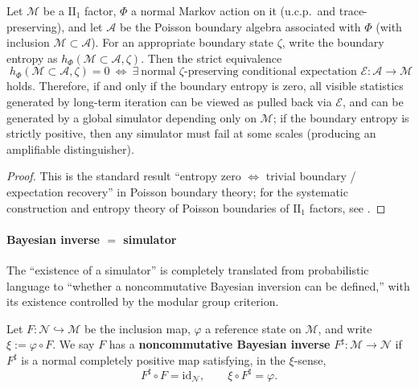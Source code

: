 \begin{theorem}\label{thm:op-algebra-poisson-boundary-entropy}
Let \(\mathcal{M}\) be a \(\mathrm{II}_1\) factor, \(\Phi\) a normal Markov action on it (u.c.p.\ and trace-preserving),
and let \(\mathcal{A}\) be the Poisson boundary algebra associated with \(\Phi\) (with inclusion \(\mathcal{M}\subset\mathcal{A}\)).
For an appropriate boundary state \(\zeta\), write the boundary entropy as \(h_\Phi(\mathcal{M}\subset\mathcal{A},\zeta)\).
Then the strict equivalence
\begin{equation}\label{eq:op-algebra-poisson-entropy-zero}
\boxed{\;
h_\Phi(\mathcal{M}\subset\mathcal{A},\zeta)=0
\ \Longleftrightarrow\
\exists\ \text{normal }\zeta\text{-preserving conditional expectation }\mathcal{E}:\mathcal{A}\to\mathcal{M}
\;}
\end{equation}
holds.
Therefore, if and only if the boundary entropy is zero, all visible statistics generated by long-term iteration can be viewed as pulled back via \(\mathcal{E}\),
and can be generated by a global simulator depending only on \(\mathcal{M}\); if the boundary entropy is strictly positive, then any simulator must fail at some scales (producing an amplifiable distinguisher).
\end{theorem}

\begin{proof}
This is the standard result ``entropy zero \(\Leftrightarrow\) trivial boundary / expectation recovery'' in Poisson boundary theory;
for the systematic construction and entropy theory of Poisson boundaries of \(\mathrm{II}_1\) factors, see \cite{DasPeterson2022PoissonBoundariesII1}.
\qedhere
\end{proof}

\paragraph{Bayesian inverse \texorpdfstring{$=$}{=} simulator}
The ``existence of a simulator'' is completely translated from probabilistic language to ``whether a noncommutative Bayesian inversion can be defined,'' with its existence controlled by the modular group criterion.

\begin{definition}\label{def:op-algebra-bayesian-inverse}
Let \(F:\mathcal{N}\hookrightarrow\mathcal{M}\) be the inclusion map, \(\varphi\) a reference state on \(\mathcal{M}\), and write \(\xi:=\varphi\circ F\).
We say \(F\) has a \textbf{noncommutative Bayesian inverse} \(F^\sharp:\mathcal{M}\to\mathcal{N}\) if \(F^\sharp\) is a normal completely positive map
satisfying, in the \(\xi\)-sense,
\begin{equation}\label{eq:op-algebra-bayes-inverse}
\boxed{\;F^\sharp\circ F=\mathrm{id}_{\mathcal{N}},\qquad \xi\circ F^\sharp=\varphi.\;}
\end{equation}
\end{definition}

